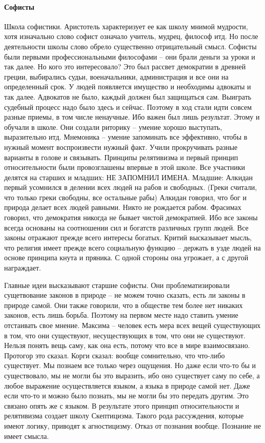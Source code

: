 \documentclass[a4paper, 12pt]{article}
\begin{document}
\paragraph{Софисты}Школа софистики. Аристотель характеризует ее как школу мнимой мудрости, хотя изначально слово софист означало учитель, мудрец, философ итд. Но после деятельности школы слово обрело существенно отрицательный смысл. Софисты были первыми профессиональными философами -- они брали деньги за уроки и так далее. Но кого это интересовало? Это был рассвет демократии в древней греции, выбирались судьи, военачальники, администрация и все они на определенный срок. У людей появляется имущество и необходимы адвокаты и так далее. Адвокатов не было, каждый должен был защищаться сам. Выиграть судебный процесс надо было здесь и сейчас. Поэтому в ход стали идти совсем разные приемы, в том числе ненаучные. Ибо важен был лишь результат. Этому и обучали в школе. Они создали риторику -- умение хорошо выступать, выразительно итд. Мнемоника -- умение запоминать все эффективно, чтобы в нужный момент воспроизвести нужный факт. Учили прокручивать разные варианты в голове и связывать. Принципы релятивизма и первый принцип относительности были провозглашены впервые в этой школе. Все участники делятся на старших и младших: НЕ ЗАПОМНИЛ ИМЕНА. Младшие: Алкидан первый усомнился в делении всех людей на рабов и свободных. (Греки считали, что только греки свободны, все остальные рабы) Алкидан говорил, что бог и природа делает всех людей равными. Никто не рождается рабом. Фрасимах говорил, что демократия никогда не бывает чистой демократией. Ибо все законы всегда основаны на соотношении сил и богатств различных групп людей. Все законы отражают прежде всего интересы богатых. Критий высказывает мысль, что религия имеет прежде всего социальную функцию -- держать в узде людей на основе принципа кнута и пряника. С одной стороны она угрожает, а с другой награждает. 

Главные идеи высказывают старшие софисты. Они проблематизировали сущетвование законов в природе -- не можем точно сказать, есть ли законы в природе самой. Они также говорили, что в обществе тем более нет никаких законов, есть лишь борьба. Поэтому на первом месте надо ставить умение отстаивать свое мнение. Максима -- человек есть мера всех вещей существующих в том, что они существуют, несуществующих в том, что они не существуют. Нельзя понять вещь саму, как она есть, потому что все в мире взаимосвязано. Протогор это сказал. Корги сказал: вообще сомнительно, что что-либо существует. Мы познаем все только через ощущения. Но даже если что-то бы и существовало, мы не могли бы это выразить, ибо оно существует саму по себе, а любое выражение осуществляется языком, а языка в природе самой нет. Даже если что-то и можно было познать, мы не могли бы это передать другим. Это связано опять же с языком. В результате этого принцип относительности и релятивизма создает школу Скептицизма. Такого рода рассуждения, которые имеют логику, приводят к агностицизму. Отказ от познания вообще. Познание не имеет смысла. 
\end{document}
